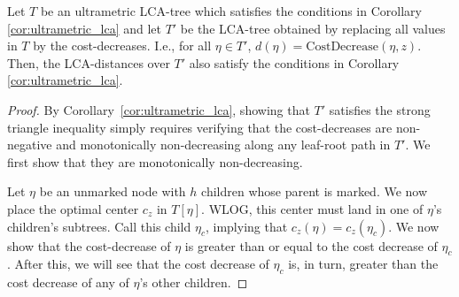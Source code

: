 \begin{lemma}
    \label{lma:cost_decreases_ultrametric}
    Let $T$ be an ultrametric LCA-tree which satisfies the conditions in Corollary \ref{cor:ultrametric_lca} and let $T'$ be the LCA-tree obtained by replacing
    all values in $T$ by the cost-decreases. I.e., for all $\eta \in T'$, $d(\eta) = \text{CostDecrease}(\eta, z)$. Then, the LCA-distances over $T'$ also satisfy the conditions
    in Corollary \ref{cor:ultrametric_lca}.
\end{lemma}


\begin{proof}
    By Corollary~\ref{cor:ultrametric_lca}, showing that $T'$ satisfies the strong triangle inequality simply requires verifying that the cost-decreases are
    non-negative and monotonically non-decreasing along any leaf-root path in $T'$. We first show that they are monotonically non-decreasing.

    Let $\eta$ be an unmarked node with $h$ children whose parent is marked.  We now place the optimal center $c_z$ in $T[\eta]$. WLOG, this center must land in
    one of $\eta$'s children's subtrees. Call this child $\eta_c$, implying that $c_z(\eta) = c_z(\eta_c)$. We now show that the cost-decrease of $\eta$ is
    greater than or equal to the cost decrease of $\eta_c$.  After this, we will see that the cost decrease of $\eta_c$ is, in turn, greater than the cost
    decrease of any of $\eta$'s other children.


\end{proof}
